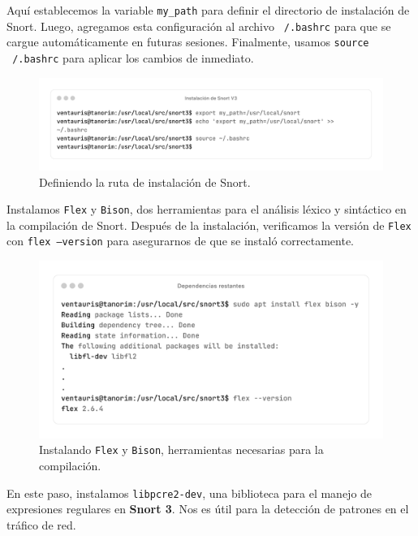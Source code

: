 \documentclass[12pt,a4paper]{report}
\begin{document}
Aquí establecemos la variable \texttt{my\_path} para definir el directorio de instalación de Snort. Luego, agregamos esta configuración al archivo \texttt{~/.bashrc} para que se cargue automáticamente en futuras sesiones. Finalmente, usamos \texttt{source ~/.bashrc} para aplicar los cambios de inmediato.

\begin{figure}[H]
	\centering
	\includegraphics[scale=0.12]{instalacion_snort/18-18.png}
	\caption{Definiendo la ruta de instalación de Snort.}
\end{figure}

\newpage

Instalamos \texttt{Flex} y \texttt{Bison}, dos herramientas para el análisis léxico y sintáctico en la compilación de Snort. Después de la instalación, verificamos la versión de \texttt{Flex} con \texttt{flex --version} para asegurarnos de que se instaló correctamente.

\begin{figure}[H]
	\centering
	\includegraphics[scale=0.12]{instalacion_snort/19-19.png}
	\caption{Instalando \texttt{Flex} y \texttt{Bison}, herramientas necesarias para la compilación.}
\end{figure}

En este paso, instalamos \texttt{libpcre2-dev}, una biblioteca para el manejo de expresiones regulares en \textbf{Snort 3}. Nos es útil para la detección de patrones en el tráfico de red.
\end{document}
